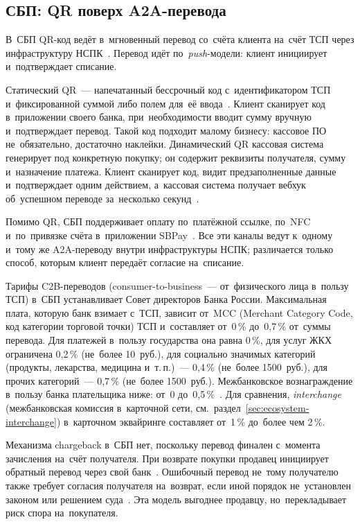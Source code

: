 \subsection*{СБП: QR поверх A2A-перевода}

В~СБП QR-код ведёт в~мгновенный перевод со~счёта клиента на~счёт ТСП через
инфраструктуру НСПК~\cite{sbp-main}. Перевод идёт по~\textit{push}-модели:
клиент инициирует и~подтверждает списание.

Статический QR~--- напечатанный бессрочный код с~идентификатором ТСП
и~фиксированной суммой либо полем для~её ввода~\cite{sbp-faq-business}. Клиент
сканирует код в~приложении своего банка, при~необходимости вводит
сумму вручную и~подтверждает перевод. Такой код подходит малому бизнесу:
кассовое ПО не~обязательно, достаточно наклейки. Динамический QR
кассовая система генерирует под конкретную покупку; он содержит реквизиты
получателя, сумму и~назначение платежа. Клиент сканирует код, видит
предзаполненные данные и~подтверждает одним действием, а~кассовая система
получает вебхук об~успешном переводе за~несколько
секунд~\cite{sbp-faq-business}.

Помимо QR, СБП поддерживает оплату по~платёжной ссылке, по~NFC и~по~привязке
счёта в~приложении SBPay~\cite{sbpay-app,sbp-main}. Все эти каналы ведут
к~одному и~тому же A2A-переводу внутри инфраструктуры НСПК; различается только
способ, которым клиент передаёт согласие на~списание.

Тарифы C2B-переводов (consumer-to-business~--- от~физического лица в~пользу
ТСП) в~СБП устанавливает Совет директоров Банка России. Максимальная плата,
которую банк взимает с~ТСП, зависит от~MCC (Merchant Category Code, код
категории торговой точки) ТСП и~составляет от~0\,\% до~0{,}7\,\% от~суммы
перевода. Для платежей в~пользу государства она равна 0\,\%, для услуг ЖКХ
ограничена 0{,}2\,\% (не~более 10~руб.), для социально значимых категорий
(продукты, лекарства, медицина и~т.\,п.)~--- 0{,}4\,\% (не~более 1500~руб.),
для прочих категорий~--- 0{,}7\,\% (не~более 1500~руб.). Межбанковское
вознаграждение в~пользу банка плательщика ниже: от~0 до~0{,}5\,\%~\cite{cbr-sbp-c2b-tariffs}. Для сравнения, \textit{interchange}
(межбанковская комиссия в~карточной сети,
см.~раздел~\ref{sec:ecosystem-interchange}) в~карточном эквайринге составляет
от~1\,\% до~более чем 2\,\%.

Механизма chargeback в~СБП нет, поскольку перевод финален с~момента
зачисления на~счёт получателя. При возврате покупки продавец инициирует
обратный перевод через свой банк~\cite{sbp-faq-business}.
Ошибочный перевод не~тому получателю также требует согласия получателя
на~возврат, если иной порядок не~установлен законом или решением
суда~\cite{cbr-sbp-faq-mistaken-transfer}. Эта модель выгоднее продавцу,
но~перекладывает риск спора на~покупателя.

